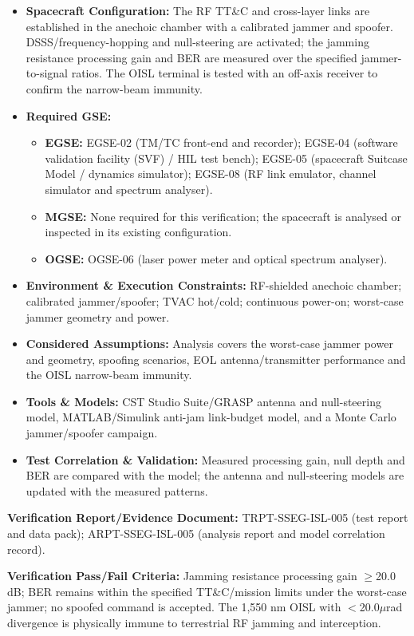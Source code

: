 \begin{itemize}
\item \textbf{Spacecraft Configuration:} The RF TT\&C and cross-layer links are established in the anechoic chamber with a calibrated jammer and spoofer. DSSS/frequency-hopping and null-steering are activated; the jamming resistance processing gain and BER are measured over the specified jammer-to-signal ratios. The OISL terminal is tested with an off-axis receiver to confirm the narrow-beam immunity.
\item \textbf{Required GSE:}
\begin{itemize}
\item \textbf{EGSE:} EGSE-02 (TM/TC front-end and recorder); EGSE-04 (software validation facility (SVF) / HIL test bench); EGSE-05 (spacecraft Suitcase Model / dynamics simulator); EGSE-08 (RF link emulator, channel simulator and spectrum analyser).
\item \textbf{MGSE:} None required for this verification; the spacecraft is analysed or inspected in its existing configuration.
\item \textbf{OGSE:} OGSE-06 (laser power meter and optical spectrum analyser).
\end{itemize}
\item \textbf{Environment \& Execution Constraints:} RF-shielded anechoic chamber; calibrated jammer/spoofer; TVAC hot/cold; continuous power-on; worst-case jammer geometry and power.
\item \textbf{Considered Assumptions:} Analysis covers the worst-case jammer power and geometry, spoofing scenarios, EOL antenna/transmitter performance and the OISL narrow-beam immunity.
\item \textbf{Tools \& Models:} CST Studio Suite/GRASP antenna and null-steering model, MATLAB/Simulink anti-jam link-budget model, and a Monte Carlo jammer/spoofer campaign.
\item \textbf{Test Correlation \& Validation:} Measured processing gain, null depth and BER are compared with the model; the antenna and null-steering models are updated with the measured patterns.
\end{itemize}
\par\textbf{Verification Report/Evidence Document:} TRPT-SSEG-ISL-005 (test report and data pack); ARPT-SSEG-ISL-005 (analysis report and model correlation record).
\par\textbf{Verification Pass/Fail Criteria:} Jamming resistance processing gain $\ge$20.0 dB; BER remains within the specified TT\&C/mission limits under the worst-case jammer; no spoofed command is accepted. The 1,550 nm OISL with $<$20.0$\mu$rad divergence is physically immune to terrestrial RF jamming and interception.
\par\medskip
